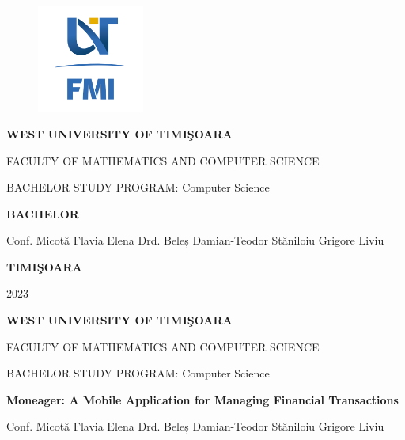 \documentclass[12pt,a4paper]{book}
\theoremstyle{definition}
\theoremstyle{remark}
\begin{document}
\sloppy

\thispagestyle{empty}
\begin{center}
\begin{figure}[h!]
\vspace{-20pt}
\begin{center}
\includegraphics[width=100pt]{Graphics/FMI-03.png}
\end{center}
\end{figure}

\end{center}
\begin{center}

{\large{\bf WEST UNIVERSITY OF TIMI\c SOARA

FACULTY OF MATHEMATICS AND COMPUTER SCIENCE

BACHELOR STUDY PROGRAM:  Computer Science 

\vspace{120pt}
{\huge {\bf BACHELOR}}

\vspace{150pt}}}

\end{center}

{\large{}

\noindent Conf. Micot\u a Flavia Elena \newline Drd. Beleș Damian-Teodor  \hfill St\u aniloiu Grigore Liviu}

\vfill




\vfill
\begin{center}
{\bf TIMI\c SOARA

2023}
\end{center}



\newpage
\thispagestyle{empty}
\begin{center}
\end{center}
\begin{center}
{\large{\bf WEST UNIVERSITY OF TIMI\c SOARA

FACULTY OF MATHEMATICS AND COMPUTER SCIENCE

BACHELOR STUDY PROGRAM:  Computer Science }



\vspace{200pt}

{\huge {\bf Moneager: A Mobile Application for Managing Financial Transactions}}

\vspace{153pt}
}
\end{center}
{\large{}

\noindent Conf. Micot\u a Flavia Elena \newline Drd. Beleș Damian-Teodor  \hfill St\u aniloiu Grigore Liviu}
\end{document}

